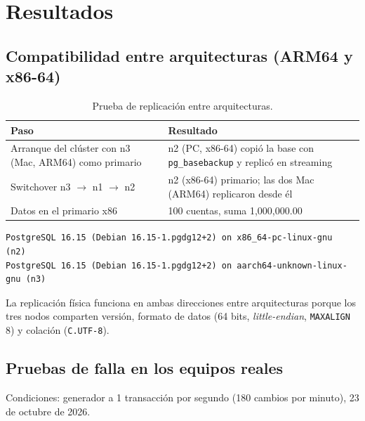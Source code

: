 \documentclass[11pt,a4paper]{article}
\newcommand{\cod}[1]{\texttt{#1}}
\newcommand{\flecha}{\ensuremath{\rightarrow}}
\begin{document}
\section{Resultados}

\subsection{Compatibilidad entre arquitecturas (ARM64 y x86-64)}

\begin{table}[H]
\centering
\small
\caption{Prueba de replicación entre arquitecturas.}
\begin{tabularx}{\textwidth}{@{}L{6cm}Y@{}}
\toprule
\textbf{Paso} & \textbf{Resultado} \\
\midrule
Arranque del clúster con n3 (Mac, ARM64) como primario & n2 (PC, x86-64) copió la base con \cod{pg\_basebackup} y replicó en streaming \\
Switchover n3 \flecha{} n1 \flecha{} n2 & n2 (x86-64) primario; las dos Mac (ARM64) replicaron desde él \\
Datos en el primario x86 & 100 cuentas, suma 1,000,000.00 \\
\bottomrule
\end{tabularx}
\end{table}

\begin{lstlisting}
PostgreSQL 16.15 (Debian 16.15-1.pgdg12+2) on x86_64-pc-linux-gnu      (n2)
PostgreSQL 16.15 (Debian 16.15-1.pgdg12+2) on aarch64-unknown-linux-gnu (n3)
\end{lstlisting}

La replicación física funciona en ambas direcciones entre arquitecturas porque los tres nodos comparten versión, formato de datos (64 bits, \emph{little-endian}, \cod{MAXALIGN} 8) y colación (\cod{C.UTF-8}).

\subsection{Pruebas de falla en los equipos reales}

Condiciones: generador a 1 transacción por segundo (180 cambios por minuto), 23 de octubre de 2026.
\end{document}
